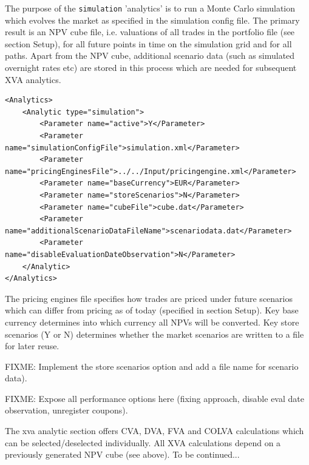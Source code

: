 \documentclass[12pt, a4paper]{article}
\begin{document}
\medskip
The purpose of the {\tt simulation} 'analytics' is to run a Monte Carlo simulation which evolves the market as specified in the simulation config file. The primary result is an NPV cube file, i.e. valuations of all trades in the portfolio file (see section Setup), for all future points in time on the simulation grid and for all paths. Apart from the NPV cube, additional scenario data (such as simulated overnight rates etc) are stored in this process which are needed for subsequent XVA analytics.  

\begin{lstlisting}[caption={ORE analytic: simulation},
 	label=lst:ore_simulation]
<Analytics>
	<Analytic type="simulation">
		<Parameter name="active">Y</Parameter>
		<Parameter name="simulationConfigFile">simulation.xml</Parameter>
		<Parameter name="pricingEnginesFile">../../Input/pricingengine.xml</Parameter>
		<Parameter name="baseCurrency">EUR</Parameter>
		<Parameter name="storeScenarios">N</Parameter>
		<Parameter name="cubeFile">cube.dat</Parameter>
		<Parameter name="additionalScenarioDataFileName">scenariodata.dat</Parameter>
		<Parameter name="disableEvaluationDateObservation">N</Parameter>
	</Analytic>
</Analytics>      
\end{lstlisting}

The pricing engines file specifies how trades are priced under future scenarios which can differ from pricing as of today (specified in section Setup).
Key base currency determines into which currency all NPVs will be converted. Key store scenarios (Y or N) determines whether the market scenarios are written to a file for later reuse.

{\color{red}FIXME: Implement the store scenarios option and add a file name for scenario data}). 

{\color{red}FIXME: Expose all performance options here (fixing approach, disable eval date observation, unregister coupons)}. 

\medskip
The xva analytic section offers CVA, DVA, FVA and COLVA calculations which can be selected/deselected individually. All XVA calculations depend on a previously generated NPV cube (see above). To be continued... 
\end{document}
